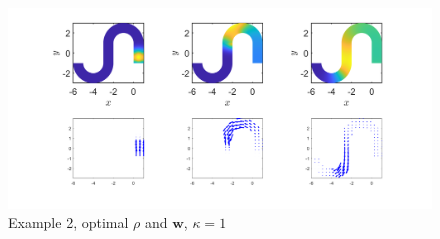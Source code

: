\documentclass[11pt, a4paper]{article}
\theoremstyle{definition}
\newcommand{\w}{\mathbf{w}}
\begin{document}
\begin{figure}[h]
	\centering
	\includegraphics[scale=0.3]{Opt21.png}
	\caption{Example 2, optimal $\rho$ and $\w$, $\kappa = 1$} 
	\label{FEx2d}
\end{figure}







	
\end{document}
